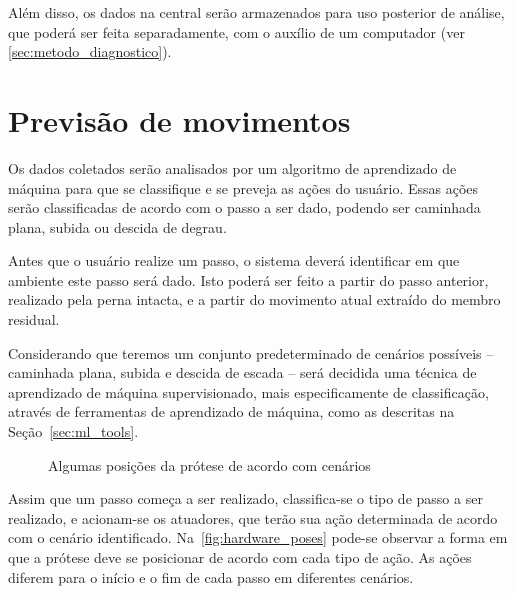 Além disso, os dados na central serão armazenados para uso posterior de análise, que poderá ser feita separadamente, com o auxílio de um computador (ver \autoref{sec:metodo_diagnostico}).

\section{Previsão de movimentos}\label{sec:metodo_previsao}
Os dados coletados serão analisados por um algoritmo de aprendizado de máquina para que se classifique e se preveja as ações do usuário. Essas ações serão classificadas de acordo com o passo a ser dado, podendo ser caminhada plana, subida ou descida de degrau.

Antes que o usuário realize um passo, o sistema deverá identificar em que ambiente este passo será dado. Isto poderá ser feito a partir do passo anterior, realizado pela perna intacta, e a partir do movimento atual extraído do membro residual.

Considerando que teremos um conjunto predeterminado de cenários possíveis -- caminhada plana, subida e descida de escada -- será decidida uma técnica de aprendizado de máquina supervisionado, mais especificamente de classificação, através de ferramentas de aprendizado de máquina, como as descritas na Seção~\ref{sec:ml_tools}.

\begin{figure}[h]
	\caption{\label{fig:hardware_poses}Algumas posições da prótese de acordo com cenários}
	\begin{center}
	\end{center}
\end{figure}

Assim que um passo começa a ser realizado, classifica-se o tipo de passo a ser realizado, e acionam-se os atuadores, que terão sua ação determinada de acordo com o cenário identificado. Na~\autoref{fig:hardware_poses} pode-se observar a forma em que a prótese deve se posicionar de acordo com cada tipo de ação. As ações diferem para o início e o fim de cada passo em diferentes cenários.

